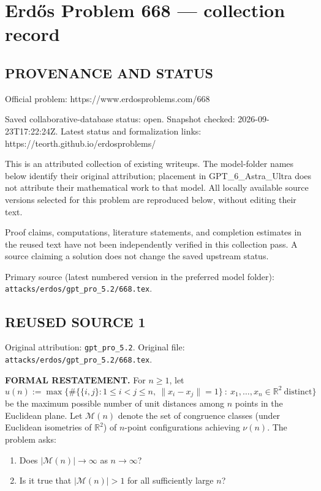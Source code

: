 \section*{Erd\H{o}s Problem 668 --- collection record}

\subsection*{PROVENANCE AND STATUS}
Official problem: https://www.erdosproblems.com/668

Saved collaborative-database status: open.
Snapshot checked: 2026-09-23T17:22:24Z.
Latest status and formalization links: https://teorth.github.io/erdosproblems/

This is an attributed collection of existing writeups. The model-folder names below identify their original attribution; placement in GPT\_6\_Astra\_Ultra does not attribute their mathematical work to that model. All locally available source versions selected for this problem are reproduced below, without editing their text.

Proof claims, computations, literature statements, and completion estimates in the reused text have not been independently verified in this collection pass. A source claiming a solution does not change the saved upstream status.

Primary source (latest numbered version in the preferred model folder): \texttt{attacks/erdos/gpt\_pro\_5.2/668.tex}.

\subsection*{REUSED SOURCE 1}
Original attribution: \texttt{gpt\_pro\_5.2}.
Original file: \texttt{attacks/erdos/gpt\_pro\_5.2/668.tex}.


\noindent\textbf{FORMAL RESTATEMENT.}
For $n\ge 1$, let
\[
u(n) := \max\{\#\{\{i,j\}: 1\le i<j\le n,\ \|x_i-x_j\|=1\}\ :\ x_1,\dots,x_n\in\mathbb{R}^2\ \text{distinct}\}
\]
be the maximum possible number of unit distances among $n$ points in the Euclidean plane.
Let $\mathcal{M}(n)$ denote the set of congruence classes (under Euclidean isometries of $\mathbb{R}^2$) of $n$-point configurations achieving $\nu(n)$.
The problem asks:
\begin{enumerate}
\item Does $|\mathcal{M}(n)|\to\infty$ as $n\to\infty$?
\item Is it true that $|\mathcal{M}(n)|>1$ for all sufficiently large $n$?
\end{enumerate}


